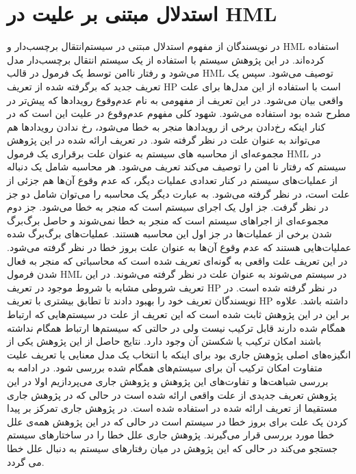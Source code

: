 \section{استدلال مبتنی بر علیت در 
HML
}
در
\cite{decomposing}
نویسندگان از مفهوم استدلال مبتنی در سیستم‌انتقال برچسب‌دار
و 
HML
 \cite{hml}
استفاده کرده‌اند.
در این پژوهش سیستم با استفاده از یک سیستم انتقال برچسب‌دار مدل می‌شود و رفتار ناامن توسط یک فرمول در قالب
HML
توصیف می‌شود.
سپس یک تعریف جدید که برگرفته شده از تعریف
HP
است با استفاده از این مدل‌ها برای علت واقعی بیان می‌شود.
در این تعریف از مفهومی به نام عدم‌وقوع
رویدادها که پیش‌تر در 
\cite{causality-checking}
مطرح شده بود استفاده می‌شود.
شهود کلی مفهوم عدم‌وقوع در علیت این است که در کنار اینکه رخ‌دادن برخی از رویداد‌ها منجر به خطا می‌شود، رخ ندادن رویداد‌ها هم می‌تواند به عنوان علت در نظر گرفته شود.
در تعریف ارائه شده در این پژوهش مجموعه‌ای از محاسبه‌
های سیستم به عنوان علت برقراری یک فرمول 
HML
در سیستم که رفتار نا امن
را توصیف می‌کند تعریف می‌شود.
هر محاسبه شامل یک دنباله از عملیات‌های سیستم در کنار تعدادی عملیات دیگر، که عدم وقوع آن‌ها هم جزئی از علت است، در نظر گرفته می‌شود.
به عبارت دیگر یک محاسبه را می‌توان شامل دو جز در نظر گرفت.
جز اول یک اجرای سیستم است که منجر به خطا می‌شود.
جز دوم مجموعه‌ای از اجراهای سیستم‌ است که منجر به خطا نمی‌شوند و حاصل برگ‌برگ‌ شدن
برخی از عملیات‌ها در جز اول این محاسبه هستند.
عملیات‌های برگ‌برگ شده عملیات‌هایی هستند که عدم وقوع آن‌ها به عنوان علت بروز 
خطا در نظر گرفته می‌شود.
در این تعریف علت‌ واقعی به گونه‌ای تعریف شده است که محاسباتی‌ که منجر به فعال شدن فرمول 
HML
در سیستم می‌شوند به عنوان علت در نظر گرفته می‌شوند.
در این تعریف شروطی مشابه با شروط موجود در تعریف 
HP
در نظر گرفته شده است.
در 
\cite{causal-hml}
نویسندگان تعریف خود را بهبود دادند تا تطابق بیشتری با تعریف 
HP
داشته باشد.
علاوه بر این در این پژوهش ثابت شده است که این تعریف از علت در سیستم‌هایی که ارتباط همگام
شده دارند قابل ترکیب نیست ولی در حالتی که سیستم‌ها ارتباط همگام نداشته باشند امکان ترکیب یا شکستن آن وجود دارد.
نتایج حاصل از این پژوهش یکی از انگیزه‌های اصلی پژوهش جاری بود برای اینکه با انتخاب یک مدل معنایی یا تعریف علیت متفاوت امکان ترکیب آن برای سیستم‌های همگام شده بررسی شود.
در ادامه به بررسی شباهت‌ها و تفاوت‌های این پژوهش و پژوهش جاری می‌پردازیم
اولا در این پژوهش تعریف جدیدی از علت واقعی ارائه شده است در حالی که در پژوهش جاری مستقیما از تعریف ارائه شده در
\cite{hp}
استفاده شده است.
در پژوهش جاری تمرکز بر پیدا کردن یک علت برای بروز خطا در سیستم است در حالی که در این پژوهش همه‌ی علل خطا مورد بررسی قرار می‌گیرند.
پژوهش جاری علل خطا را در ساختار‌های سیستم جستجو می‌کند در حالی که این پژوهش در میان رفتار‌های سیستم به دنبال علل خطا می گردد.

